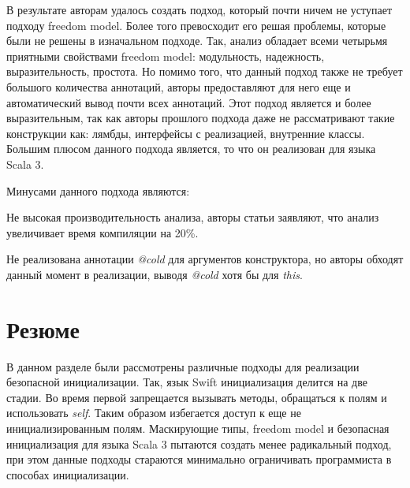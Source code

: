 В результате авторам удалось создать подход, который почти ничем не уступает подходу freedom model.
Более того превосходит его решая проблемы, которые были не решены в изначальном подходе.
Так, анализ обладает всеми четырьмя приятными свойствами freedom model: модульность, надежность, выразительность, простота.
Но помимо того, что данный подход также не требует большого количества аннотаций,
авторы предоставляют для него еще и автоматический вывод почти всех аннотаций.
Этот подход является и более выразительным, так как авторы прошлого подхода даже не рассматривают такие конструкции как:
лямбды, интерфейсы с реализацией, внутренние классы.
Большим плюсом данного подхода является, то что он реализован для языка Scala 3.

Минусами данного подхода являются:
\begin{itemize*}
    \item Не высокая производительность анализа, авторы статьи заявляют, что анализ увеличивает время компиляции на 20\%.
    \item Не реализована аннотации \emph{@cold} для аргументов конструктора,
    но авторы обходят данный момент в реализации, выводя \emph{@cold} хотя бы для \emph{this}.
\end{itemize*}

\section{Резюме}\label{sec:обзор-резюме}

В данном разделе были рассмотрены различные подходы для реализации безопасной инициализации.
Так, язык Swift инициализация делится на две стадии.
Во время первой запрещается вызывать методы, обращаться к полям и использовать \emph{self}.
Таким образом избегается доступ к еще не инициализированным полям.
Маскирующие типы, freedom model и безопасная инициализация для языка Scala 3 пытаются создать менее радикальный подход,
при этом данные подходы стараются минимально ограничивать программиста в способах инициализации.

